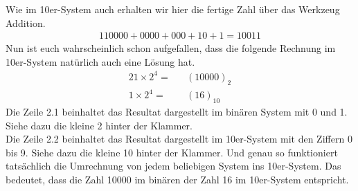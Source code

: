 Wie im 10er-System auch erhalten wir hier die fertige Zahl über das Werkzeug \frqq Addition\flqq.
\begin{alignat*}{1}
    10000 + 0000 + 000 + 10 + 1 = 10011
\end{alignat*}
Nun ist euch wahrscheinlich schon aufgefallen, dass die folgende Rechnung im 10er-System natürlich auch eine Lösung hat.
\begin{alignat}{2}
    1 \times 2^4 = && (10000)_2\\
    1 \times 2^4 = && (16)_{10}
\end{alignat}
Die Zeile 2.1 beinhaltet das Resultat dargestellt im binären System mit 0 und 1. Siehe dazu die kleine 2 hinter der Klammer.\\
Die Zeile 2.2 beinhaltet das Resultat dargestellt im 10er-System mit den Ziffern 0 bis 9. Siehe dazu die kleine 10 hinter der Klammer.
Und genau so funktioniert tatsächlich die Umrechnung von jedem beliebigen System ins 10er-System.
Das bedeutet, dass die Zahl 10000 im binären der Zahl 16 im 10er-System entspricht.
